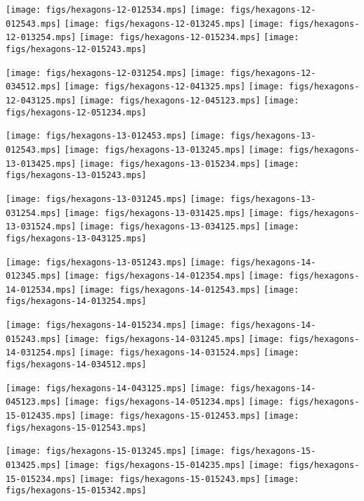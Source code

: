 \noindent
\texttt{[image: figs/hexagons-12-012534.mps]}
\texttt{[image: figs/hexagons-12-012543.mps]}
\texttt{[image: figs/hexagons-12-013245.mps]}
\texttt{[image: figs/hexagons-12-013254.mps]}
\texttt{[image: figs/hexagons-12-015234.mps]}
\texttt{[image: figs/hexagons-12-015243.mps]}

\noindent
\texttt{[image: figs/hexagons-12-031254.mps]}
\texttt{[image: figs/hexagons-12-034512.mps]}
\texttt{[image: figs/hexagons-12-041325.mps]}
\texttt{[image: figs/hexagons-12-043125.mps]}
\texttt{[image: figs/hexagons-12-045123.mps]}
\texttt{[image: figs/hexagons-12-051234.mps]}

\noindent
\texttt{[image: figs/hexagons-13-012453.mps]}
\texttt{[image: figs/hexagons-13-012543.mps]}
\texttt{[image: figs/hexagons-13-013245.mps]}
\texttt{[image: figs/hexagons-13-013425.mps]}
\texttt{[image: figs/hexagons-13-015234.mps]}
\texttt{[image: figs/hexagons-13-015243.mps]}

\noindent
\texttt{[image: figs/hexagons-13-031245.mps]}
\texttt{[image: figs/hexagons-13-031254.mps]}
\texttt{[image: figs/hexagons-13-031425.mps]}
\texttt{[image: figs/hexagons-13-031524.mps]}
\texttt{[image: figs/hexagons-13-034125.mps]}
\texttt{[image: figs/hexagons-13-043125.mps]}

\noindent
\texttt{[image: figs/hexagons-13-051243.mps]}
\texttt{[image: figs/hexagons-14-012345.mps]}
\texttt{[image: figs/hexagons-14-012354.mps]}
\texttt{[image: figs/hexagons-14-012534.mps]}
\texttt{[image: figs/hexagons-14-012543.mps]}
\texttt{[image: figs/hexagons-14-013254.mps]}

\noindent
\texttt{[image: figs/hexagons-14-015234.mps]}
\texttt{[image: figs/hexagons-14-015243.mps]}
\texttt{[image: figs/hexagons-14-031245.mps]}
\texttt{[image: figs/hexagons-14-031254.mps]}
\texttt{[image: figs/hexagons-14-031524.mps]}
\texttt{[image: figs/hexagons-14-034512.mps]}

\noindent
\texttt{[image: figs/hexagons-14-043125.mps]}
\texttt{[image: figs/hexagons-14-045123.mps]}
\texttt{[image: figs/hexagons-14-051234.mps]}
\texttt{[image: figs/hexagons-15-012435.mps]}
\texttt{[image: figs/hexagons-15-012453.mps]}
\texttt{[image: figs/hexagons-15-012543.mps]}

\noindent
\texttt{[image: figs/hexagons-15-013245.mps]}
\texttt{[image: figs/hexagons-15-013425.mps]}
\texttt{[image: figs/hexagons-15-014235.mps]}
\texttt{[image: figs/hexagons-15-015234.mps]}
\texttt{[image: figs/hexagons-15-015243.mps]}
\texttt{[image: figs/hexagons-15-015342.mps]}

